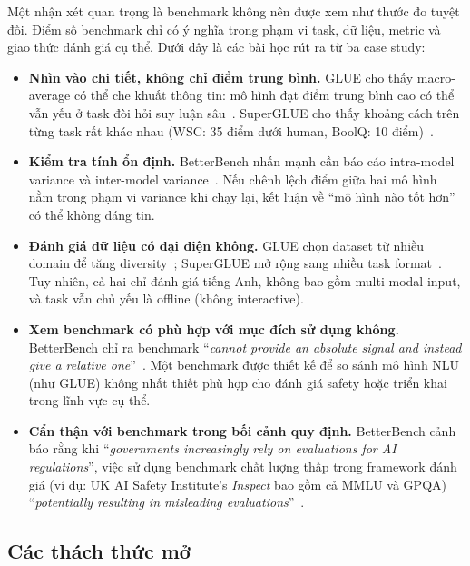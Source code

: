 Một nhận xét quan trọng là benchmark không nên được xem như thước đo tuyệt đối. Điểm số benchmark chỉ có ý nghĩa trong phạm vi task, dữ liệu, metric và giao thức đánh giá cụ thể. Dưới đây là các bài học rút ra từ ba case study:

\begin{itemize}
    \item \textbf{Nhìn vào chi tiết, không chỉ điểm trung bình.} GLUE cho thấy macro-average có thể che khuất thông tin: mô hình đạt điểm trung bình cao có thể vẫn yếu ở task đòi hỏi suy luận sâu~\cite{glue}. SuperGLUE cho thấy khoảng cách trên từng task rất khác nhau (WSC: 35 điểm dưới human, BoolQ: 10 điểm)~\cite{superglue}.

    \item \textbf{Kiểm tra tính ổn định.} BetterBench nhấn mạnh cần báo cáo intra-model variance và inter-model variance~\cite{betterbench}. Nếu chênh lệch điểm giữa hai mô hình nằm trong phạm vi variance khi chạy lại, kết luận về ``mô hình nào tốt hơn'' có thể không đáng tin.

    \item \textbf{Đánh giá dữ liệu có đại diện không.} GLUE chọn dataset từ nhiều domain để tăng diversity~\cite{glue}; SuperGLUE mở rộng sang nhiều task format~\cite{superglue}. Tuy nhiên, cả hai chỉ đánh giá tiếng Anh, không bao gồm multi-modal input, và task vẫn chủ yếu là offline (không interactive).

    \item \textbf{Xem benchmark có phù hợp với mục đích sử dụng không.} BetterBench chỉ ra benchmark ``\textit{cannot provide an absolute signal and instead give a relative one}''~\cite{betterbench}. Một benchmark được thiết kế để so sánh mô hình NLU (như GLUE) không nhất thiết phù hợp cho đánh giá safety hoặc triển khai trong lĩnh vực cụ thể.

    \item \textbf{Cẩn thận với benchmark trong bối cảnh quy định.} BetterBench cảnh báo rằng khi ``\textit{governments increasingly rely on evaluations for AI regulations}'', việc sử dụng benchmark chất lượng thấp trong framework đánh giá (ví dụ: UK AI Safety Institute's \textit{Inspect} bao gồm cả MMLU và GPQA) ``\textit{potentially resulting in misleading evaluations}''~\cite{betterbench}.
\end{itemize}

\subsection{Các thách thức mở}

